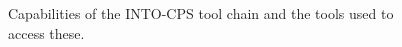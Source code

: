 \begin{figure}[bt]
\caption{Capabilities of the INTO-CPS tool chain and the tools used to access these.}
\label{fig:project_view}
\end{figure}
